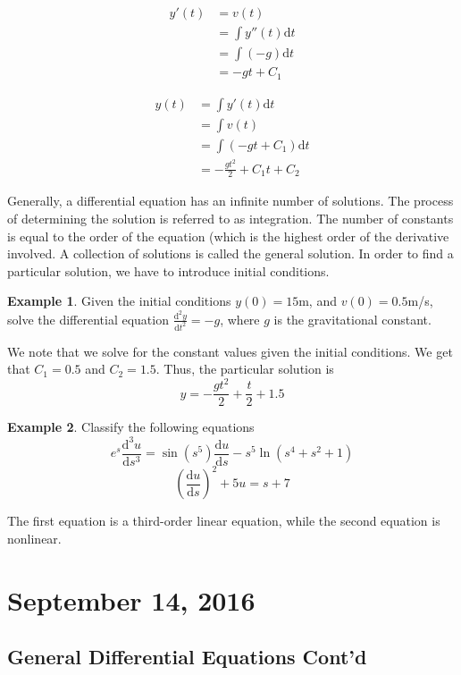 \documentclass[11pt]{article}
\theoremstyle{plain} %
\theoremstyle{definition}
\theoremstyle{example}
\newtheorem*{example}{Example}
\theoremstyle{remark}
\begin{document}
\begin{align*}
	y'(t) &= v(t)  \\
		&= \int y''(t)\mathrm d t\\
		&= \int (-g)\mathrm d t\\
		&= -gt+C_1
\end{align*}

\begin{align*}
	y(t) &= \int y'(t) \mathrm d t\\
	&= \int v(t)\\
	&= \int \left(-gt+C_1\right)\mathrm d t\\
	&= -\frac{gt^2}{2}+C_1t+C_2
\end{align*}

Generally, a differential equation has an infinite number of solutions. The process of determining the solution is referred to as integration. The number of constants is equal to the order of the equation (which is the highest order of the derivative involved. A collection of solutions is called the general solution. In order to find a particular solution, we have to introduce initial conditions.

\begin{example}
Given the initial conditions $y(0) = 15$m, and $v(0) = 0.5$m/s, solve the differential equation $\frac{\mathrm d^2y}{\mathrm d t^2} = -g$, where $g$ is the gravitational constant.
\end{example}

We note that we solve for the constant values given the initial conditions. We get that $C_1 = 0.5$ and $C_2 = 1.5$. Thus, the particular solution is $$y = -\frac{gt^2}{2}+\frac{t}{2}+1.5$$

\begin{example}
Classify the following equations $$e^s \frac{\mathrm d^3 u}{\mathrm d s^3} = \sin(s^5)\frac{\mathrm d u}{\mathrm d s} - s^5\ln(s^4+s^2+1)$$
$$\left(\frac{\mathrm d u}{\mathrm d s}\right)^2+5u = s+7$$
\end{example}

The first equation is a third-order linear equation, while the second equation is nonlinear.

\section{September 14, 2016}
\subsection{General Differential Equations Cont'd}
\end{document}
